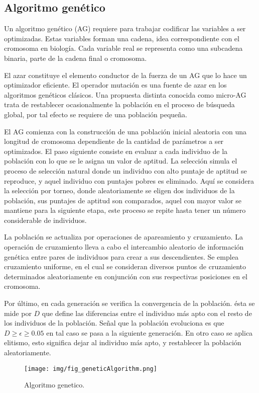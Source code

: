 \subsection{Algoritmo gen\'etico}

Un algoritmo gen\'etico (AG) requiere para trabajar codificar
las variables a ser optimizadas. Estas variables forman
una cadena, idea correspondiente con el cromosoma en biolog\'ia.
Cada variable real se representa como una subcadena
binaria, parte de la cadena final o cromosoma.

El azar constituye el elemento conductor de la fuerza de
un AG que lo hace un optimizador eficiente. El operador mutaci\'on
es una fuente de azar en los algoritmos gen\'eticos cl\'asicos.
Una propuesta distinta conocida como micro-AG trata
de restablecer ocasionalmente la poblaci\'on en el proceso de
b\'usqueda global, por tal efecto se requiere de una poblaci\'on
peque\~na.

El AG comienza con la construcci\'on de una poblaci\'on
inicial aleatoria con una longitud de cromosoma dependiente
de la cantidad de par\'ametros a ser optimizados. El paso
siguiente consiste en evaluar a cada individuo de la poblaci\'on
con lo que se le asigna un valor de aptitud. La selecci\'on simula
el proceso de selecci\'on natural donde un individuo con alto
puntaje de aptitud se reproduce, y aquel individuo con puntajes
pobres es eliminado. Aqu\'i se considera la selecci\'on por
torneo, donde aleatoriamente se eligen dos individuos de la
poblaci\'on, sus puntajes de aptitud son comparados, aquel con
mayor valor se mantiene para la siguiente etapa, este proceso
se repite hasta tener un n\'umero considerable de individuos.

La poblaci\'on se actualiza por operaciones de apareamiento
y cruzamiento. La operaci\'on de cruzamiento lleva a cabo
el intercambio aleatorio de informaci\'on gen\'etica entre pares
de individuos para crear a sus descendientes. Se emplea cruzamiento
uniforme, en el cual se consideran diversos puntos
de cruzamiento determinados aleatoriamente en conjunci\'on
con sus respectivas posiciones en el cromosoma.

Por \'ultimo, en cada generaci\'on se verifica la convergencia
de la poblaci\'on. \'esta se mide por $D$ que define las diferencias
entre el individuo m\'as apto con el resto de los individuos
de la poblaci\'on. Se\~nal que la poblaci\'on evoluciona es que
$D\geq\epsilon\geq0.05$ en tal caso se pasa a la siguiente generaci\'on.
En otro caso se aplica elitismo, esto significa dejar al individuo
m\'as apto, y restablecer la poblaci\'on aleatoriamente.

\begin{figure}[H]
	\centering
	\texttt{[image: img/fig\_geneticAlgorithm.png]}
	\caption{Algoritmo genetico.}
	\label{fig:algoritmo genetico}
\end{figure}
